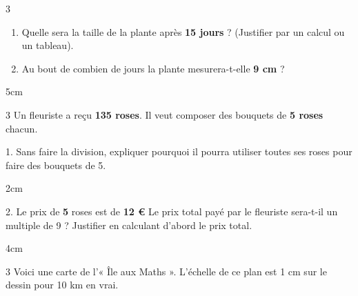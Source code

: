 \documentclass[a4paper]{book}
\begin{document}
{\begin{exerciceNote}{3}
        \begin{enumerate}[leftmargin=*]
            \item Quelle sera la taille de la plante après \textbf{15 jours} ? (Justifier par un calcul ou un tableau).

            \item Au bout de combien de jours la plante mesurera-t-elle \textbf{9 cm} ?
        \end{enumerate}
        
        \begin{ZoneReponse}{5cm}
        \end{ZoneReponse}
    \end{exerciceNote}


    \begin{exerciceNote}{3}
        Un fleuriste a reçu \textbf{135 roses}. Il veut composer des bouquets de \textbf{5 roses} chacun.
        
        1. Sans faire la division, expliquer pourquoi il pourra utiliser toutes ses roses pour faire des bouquets de 5.
        \begin{ZoneReponse}{2cm}
        \end{ZoneReponse}
    
        2. Le prix de \textbf{5} roses est de \textbf{12 \euro} Le prix total payé par le fleuriste sera-t-il un multiple de 9 ? Justifier en calculant d'abord le prix total.
        \begin{ZoneReponse}{4cm}
        \end{ZoneReponse}
    \end{exerciceNote}


\newpage
    

    \begin{exerciceNote}{3}
        Voici une carte de l'« Île aux Maths ». L'échelle de ce plan est 1 cm sur le dessin pour 10 km en vrai.

        \begin{center}
\end{center}
\end{exerciceNote}}
\end{document}
